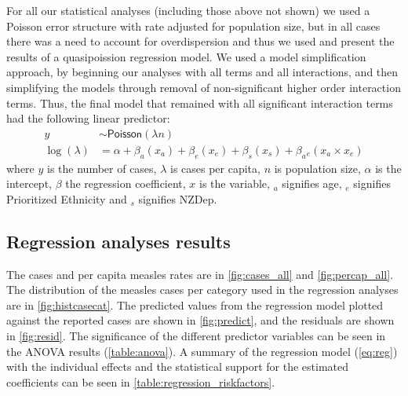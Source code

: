 \documentclass{article}
\begin{document}
For all our statistical analyses (including those above not shown) we used a Poisson error structure with rate adjusted for population size, but in all cases there was a need to account for overdispersion and thus we used and present the results of a quasipoission regression model. We used a model simplification approach, by beginning our analyses with all terms and all interactions, and then simplifying the models through removal of non-significant higher order interaction terms. Thus, the final model that remained with all significant interaction terms had the following linear predictor:
\begin{align}\label{eq:reg}
 y &\sim \textsf{Poisson}(\lambda n)\\
 \log(\lambda) &= \alpha + \beta _a (x_a)+ \beta _e(x_e)+ \beta _s (x_s) + \beta _a{}_e(x_a \times x_e)
  \end{align}
where $y$ is the number of cases, $\lambda$ is cases per capita, $n$ is population size, $\alpha$ is the intercept, $\beta$ the regression coefficient, $x$ is the variable, $_a$ signifies age, $_e$ signifies Prioritized Ethnicity and $_s$ signifies NZDep.

\subsection{Regression analyses results}
\label{sub:regression_results}

The cases and per capita measles rates are in \autoref{fig:cases_all} and \autoref{fig:percap_all}. The distribution of the measles cases per category used in the regression analyses are in \autoref{fig:histcasecat}. The predicted values from the regression model plotted against the reported cases are shown in \autoref{fig:predict}, and the residuals are shown in \autoref{fig:resid}. The significance of the different predictor variables can be seen in the ANOVA results (\autoref{table:anova}). A summary of the regression model (\autoref{eq:reg}) with the individual effects and the statistical support for the estimated coefficients can be seen in \autoref{table:regression_riskfactors}.
\end{document}
